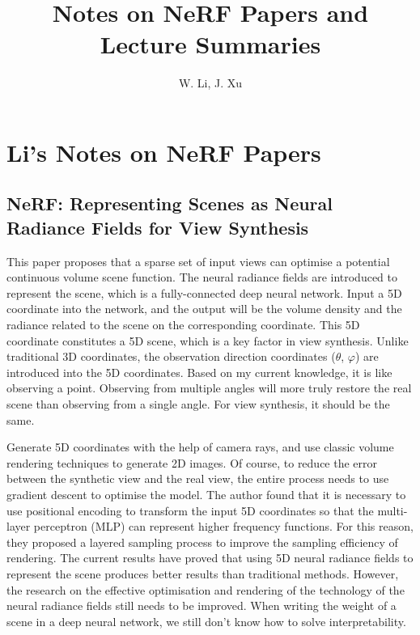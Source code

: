 \documentclass[UTF-8]{ctexart}
\title{Notes on NeRF Papers and Lecture Summaries}
\author{W. Li, J. Xu}
\begin{document}
\maketitle


\section{Li's Notes on NeRF Papers}

\subsection{NeRF: Representing Scenes as Neural Radiance Fields for View Synthesis}
This paper proposes that a sparse set of input views can optimise a potential continuous volume scene function. The neural radiance fields are introduced to represent the scene, which is a fully-connected deep neural network. Input a 5D coordinate into the network, and the output will be the volume density and the radiance related to the scene on the corresponding coordinate. This 5D coordinate constitutes a 5D scene, which is a key factor in view synthesis. Unlike traditional 3D coordinates, the observation direction coordinates ($\theta$, $\varphi$) are introduced into the 5D coordinates. Based on my current knowledge, it is like observing a point. Observing from multiple angles will more truly restore the real scene than observing from a single angle. For view synthesis, it should be the same. 

Generate 5D coordinates with the help of camera rays, and use classic volume rendering techniques to generate 2D images. Of course, to reduce the error between the synthetic view and the real view, the entire process needs to use gradient descent to optimise the model. The author found that it is necessary to use positional encoding to transform the input 5D coordinates so that the multi-layer perceptron (MLP) can represent higher frequency functions. For this reason, they proposed a layered sampling process to improve the sampling efficiency of rendering. The current results have proved that using 5D neural radiance fields to represent the scene produces better results than traditional methods. However, the research on the effective optimisation and rendering of the technology of the neural radiance fields still needs to be improved. When writing the weight of a scene in a deep neural network, we still don't know how to solve interpretability.
\end{document}
